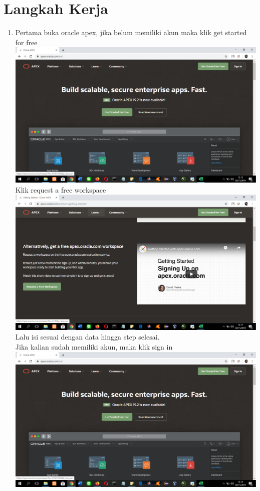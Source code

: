 \clearpage
\setcounter{page}{1}

\section{Langkah Kerja}
\begin{enumerate}

\item Pertama buka oracle apex, jika belum memiliki akun maka klik get started for free\\
\includegraphics[scale= 0.3]{gambar/gambar1.png}\\
Klik request a free workspace\\
\includegraphics[scale= 0.3]{gambar/gambar2.png}\\
Lalu isi sesuai dengan data hingga step selesai.\\
Jika kalian sudah memiliki akun, maka klik sign in\\
\includegraphics[scale= 0.3]{gambar/gambar1.png}\\

\end{enumerate}
